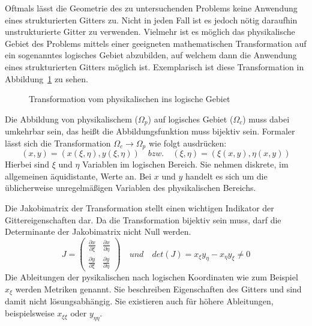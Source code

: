 Oftmals lässt die Geometrie des zu untersuchenden Problems keine Anwendung eines
strukturierten Gitters zu. Nicht in jeden Fall ist es jedoch nötig daraufhin unstrukturierte
Gitter zu verwenden. Vielmehr ist es möglich das physikalische Gebiet des Problems
mittels einer geeigneten mathematischen Transformation auf ein sogenanntes
logisches Gebiet abzubilden, auf welchem dann die Anwendung eines strukturierten Gitters
möglich ist. Exemplarisch ist diese Transformation in Abbildung~\ref{fig:transf} zu sehen.
\begin{figure}[ht]

\centering
\caption{Transformation vom physikalischen ins logische Gebiet}
\label{fig:transf}
\end{figure}
Die Abbildung von physikalischem ($\Omega_p$) auf logisches Gebiet ($\Omega_c$) muss dabei umkehrbar sein, das heißt
die Abbildungsfunktion muss bijektiv sein. Formaler lässt sich die Transformation
$\Omega_c \rightarrow \Omega_p$ wie folgt ausdrücken:
\begin{equation}
  (x,y) = (x(\xi, \eta), y(\xi, \eta)) \quad bzw. \quad (\xi,\eta) = (\xi(x, y), \eta(x,y))
\end{equation}
Hierbei sind $\xi$ und $\eta$ Variablen im logischen Bereich. Sie nehmen diskrete, im allgemeinen äquidistante,
Werte an. Bei $x$ und $y$ handelt es sich um die üblicherweise unregelmäßigen Variablen des physikalischen Bereichs.

Die Jakobimatrix der Transformation stellt einen wichtigen Indikator der Gittereigenschaften dar.
Da die Transformation bijektiv sein muss, darf die Determinante der Jakobimatrix nicht Null werden.
\begin{equation}
  J = 
  \begin{pmatrix}
    \frac{\partial x}{\partial \xi} & \frac{\partial x}{\partial \eta} \\
    \frac{\partial y}{\partial \xi} & \frac{\partial y}{\partial \eta}
  \end{pmatrix}
  \quad und \quad
  det (J) = x_{\xi}y_{\eta} - x_{\eta} y_{\xi} \neq 0
  \label{eq:detj}
\end{equation}
Die Ableitungen der pysikalischen nach logischen Koordinaten wie
zum Beispiel $x_{\xi}$ werden Metriken genannt. Sie beschreiben Eigenschaften
des Gitters und sind damit nicht lösungsabhängig. Sie existieren auch
für höhere Ableitungen, beispielsweise $x_{\xi\xi}$ oder $y_{\eta\eta}$.
